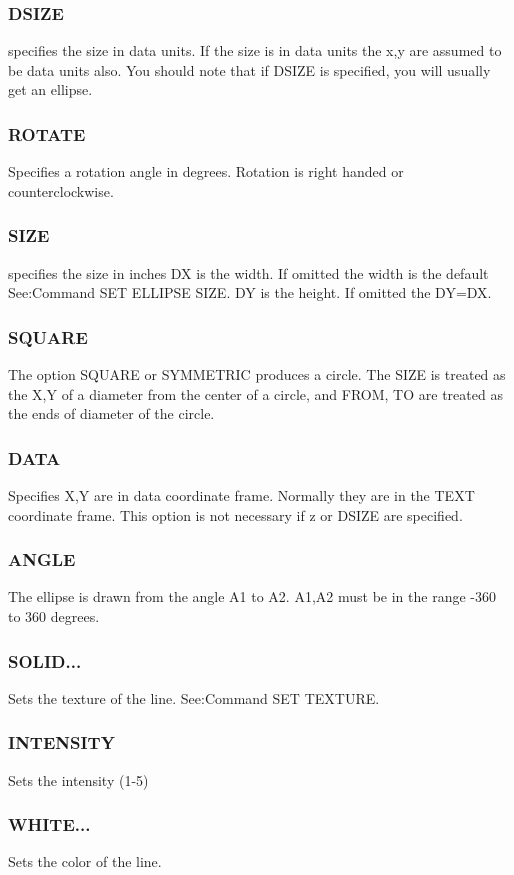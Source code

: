 \subsubsection{DSIZE}
specifies the size in data units.  If the size is in data units the x,y
are assumed to be data units also.  You should note that  if  DSIZE  is
specified, you will usually get an ellipse.  
\subsubsection{ROTATE}
Specifies  a  rotation  angle  in degrees.  Rotation is right handed or
counterclockwise.  
\subsubsection{SIZE}
specifies  the size in inches DX is the width.  If omitted the width is
the  default  See:Command SET ELLIPSE SIZE.   DY  is  the  height.   If
omitted the DY=DX.  
\subsubsection{SQUARE}
The  option SQUARE or SYMMETRIC produces a circle.  The SIZE is treated
as the X,Y of a diameter from the center of a circle, and FROM, TO  are
treated as the ends of diameter of the circle.  
\subsubsection{DATA}
Specifies  X,Y  are in data coordinate frame.  Normally they are in the
TEXT coordinate frame.  This option is not necessary if z or DSIZE  are
specified.  
\subsubsection{ANGLE}
The  ellipse  is  drawn  from the angle A1 to A2.  A1,A2 must be in the
range -360 to 360 degrees.  
\subsubsection{SOLID...}
Sets the texture of the line.  See:Command SET TEXTURE.  
\subsubsection{INTENSITY}
Sets the intensity (1-5) 
\subsubsection{WHITE...}
Sets the color of the line.  
